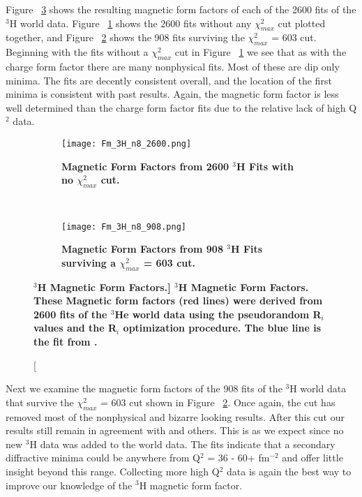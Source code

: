 Figure ~\ref{fig:3h_fm} shows the resulting magnetic form factors of each of the 2600 fits of the $^3$H world data. Figure ~\ref{fig:3h_fm_no_cut} shows the 2600 fits without any $\chi^2_{max}$ cut plotted together, and Figure ~\ref{fig:3h_fm_cut} shows the 908 fits surviving the $\chi^2_{max}$ = 603 cut. Beginning with the fits without a $\chi^2_{max}$ cut in Figure ~\ref{fig:3h_fm_no_cut} we see that as with the charge form factor there are many nonphysical fits. Most of these are dip only minima. The fits are decently consistent overall, and the location of the first minima is consistent with past results. Again, the magnetic form factor is less well determined than the charge form factor fits due to the relative lack of high Q$^2$ data. 

\begin{figure}[!ht]
\begin{subfigure}{1.\textwidth}
  \centering
  \texttt{[image: Fm\_3H\_n8\_2600.png]}
  \caption{\bf{Magnetic Form Factors from 2600 $^3$H Fits with no $\chi^2_{max}$ cut.}}
  \label{fig:3h_fm_no_cut}
\end{subfigure}\\
\begin{subfigure}{1.\textwidth}
  \centering
  \texttt{[image: Fm\_3H\_n8\_908.png]}
  \caption{\bf{Magnetic Form Factors from 908 $^3$H Fits surviving a $\chi^2_{max}$ = 603 cut.}}
  \label{fig:3h_fm_cut}
\end{subfigure}
\caption[\bf{$^3$H Magnetic Form Factors.}] {
{\bf{$^3$H Magnetic Form Factors.}} These Magnetic form factors (red lines) were derived from 2600 fits of the $^3$He world data using the pseudorandom R$_i$ values and the R$_i$ optimization procedure. The blue line is the fit from \cite{Article:Amroun}.}
\label{fig:3h_fm}
\end{figure}

Next we examine the magnetic form factors of the 908 fits of the $^3$H world data that survive the $\chi^2_{max}$ = 603 cut shown in Figure ~\ref{fig:3h_fm_cut}. Once again, the cut has removed most of the nonphysical and bizarre looking results. After this cut our results still remain in agreement with \cite{Article:Amroun} and others. This is as we expect since no new $^3$H data was added to the world data. The fits indicate that a secondary diffractive minima could be anywhere from Q$^2$ = 36 - 60+ fm$^{-2}$ and offer little insight beyond this range. Collecting more high Q$^2$ data is again the best way to improve our knowledge of the $^3$H magnetic form factor.

